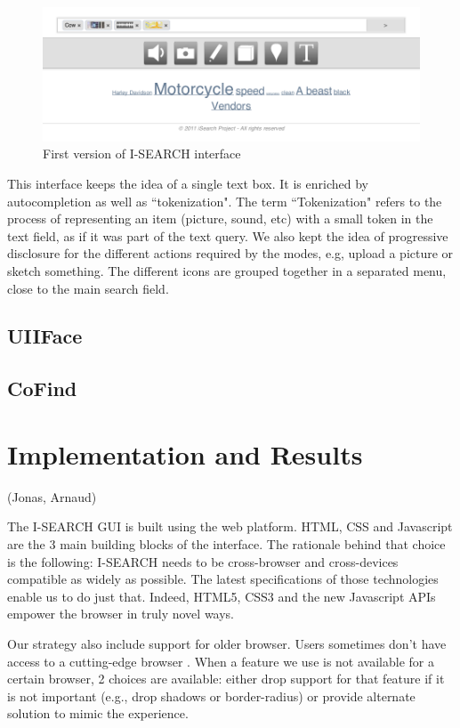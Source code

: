 \documentclass[runningheads,a4paper]{llncs}
\begin{document}
\begin{figure}[h!]
  \centering
    \includegraphics[width=0.8\linewidth]{resources/isearch-UI.png}
  \caption{First version of I-SEARCH interface}
  \label{fig:isearch-ui}
\end{figure}

This interface keeps the idea of a single text box. It is enriched by autocompletion as well as ``tokenization". The term ``Tokenization" refers to the process of representing an item (picture, sound, etc) with a small token in the text field, as if it was part of the text query. We also kept the idea of progressive disclosure for the different actions required by the modes, e.g, upload a picture or sketch something. The different icons are grouped together in a separated menu, close to the main search field.

\subsection{UIIFace}

\subsection{CoFind}

\section{Implementation and Results}
(Jonas, Arnaud)

The I-SEARCH GUI is built using the web platform. HTML, CSS and Javascript are the 3 main building blocks of the interface. The rationale behind that choice is the following: I-SEARCH needs to be cross-browser and cross-devices compatible as widely as possible. The latest specifications of those technologies enable us to do just that. Indeed, HTML5, CSS3 and the new Javascript APIs empower the browser in truly novel ways.

Our strategy also include support for older browser. Users sometimes don't have access to a cutting-edge browser  . When a feature we use is not available for a certain browser, 2 choices are available: either drop support for that feature if it is not important (e.g., drop shadows or border-radius) or provide alternate solution to mimic the experience.
\end{document}
